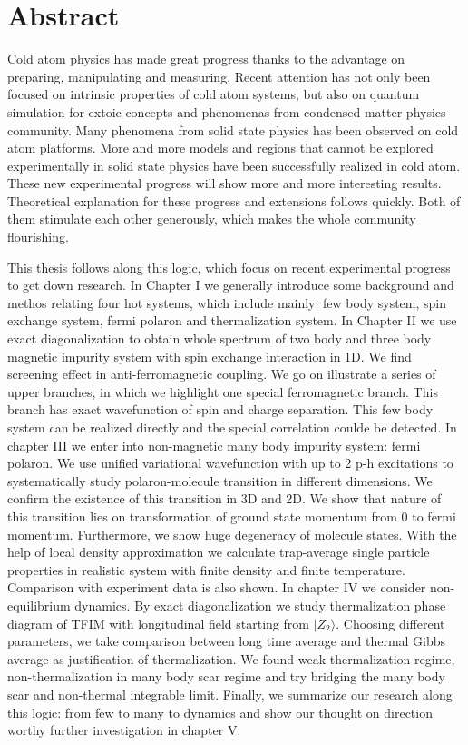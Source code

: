 \intobmk\chapter*{Abstract}%

Cold atom physics has made great progress thanks to the advantage on preparing, manipulating and measuring. Recent attention has not only been focused on intrinsic properties of cold atom systems, but also on quantum simulation for extoic concepts and phenomenas from condensed matter physics community. Many phenomena from solid state physics has been observed on cold atom platforms. More and more models and regions that cannot be explored experimentally in solid state physics have been successfully realized in cold atom. These new experimental progress will show more and more interesting results. Theoretical explanation for these progress and extensions follows quickly. Both of them stimulate each other generously, which makes the whole community flourishing.

This thesis follows along this logic, which focus on recent experimental progress to get down research. In Chapter I we generally introduce some background and methos relating four hot systems, which include mainly: few body system, spin exchange system, fermi polaron and thermalization system. In Chapter II we use exact diagonalization to obtain whole spectrum of two body and three body magnetic impurity system with spin exchange interaction in 1D. We find screening effect in anti-ferromagnetic coupling. We go on illustrate a series of upper branches, in which we highlight one special ferromagnetic branch. This branch has exact wavefunction of spin and charge separation. This few body system can be realized directly and the special correlation coulde be detected. In chapter III we enter into non-magnetic many body impurity system: fermi polaron. We use unified variational wavefunction with up to 2 p-h excitations to systematically study polaron-molecule transition in different dimensions. We confirm the existence of this transition in 3D and 2D. We show that nature of this transition lies on transformation of ground state momentum from 0 to fermi momentum. Furthermore, we show huge degeneracy of molecule states. With the help of local density approximation we calculate trap-average single particle properties in realistic system with finite density and finite temperature. Comparison with experiment data is also shown. In chapter IV we consider non-equilibrium dynamics. By exact diagonalization we study thermalization phase diagram of TFIM with longitudinal field starting from $|Z_2\rangle$. Choosing different parameters, we take comparison between long time average and thermal Gibbs average as justification of thermalization. We found weak thermalization regime, non-thermalization in many body scar regime and try bridging the many body scar and non-thermal integrable limit. Finally, we summarize our research along this logic: from few to many to dynamics and show our thought on direction worthy further investigation in chapter V.

